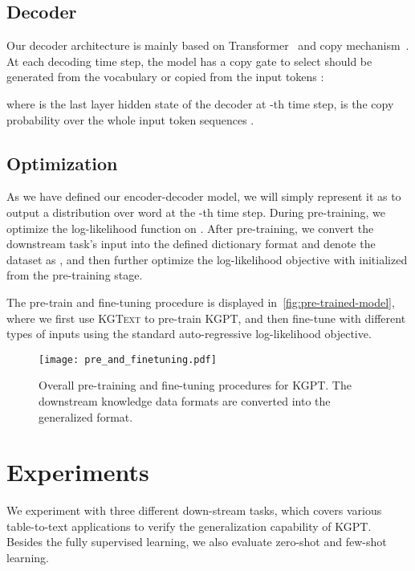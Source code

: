 \documentclass[11pt,a4paper]{article}
\newcommand{\dataset}{\textsc{KGText}\xspace}
\newcommand{\model}{KGPT\xspace}
\begin{document}
\subsection{Decoder}
Our decoder architecture is mainly based on Transformer~\cite{vaswani2017attention} and copy mechanism~\cite{see2017get}. At each decoding time step, the model has a copy gate  to select  should be generated from the vocabulary  or copied from the input tokens :

where  is the last layer hidden state of the decoder at -th time step,  is the copy probability over the whole input token sequences . 

\subsection{Optimization}
As we have defined our encoder-decoder model, we will simply represent it as  to output a distribution over word  at the -th time step. During pre-training, we optimize the log-likelihood function on . After pre-training, we convert the downstream task's input into the defined dictionary format and denote the dataset as , and then further optimize the log-likelihood objective with  initialized from the pre-training stage. 

The pre-train and fine-tuning procedure is displayed in~\autoref{fig:pre-trained-model}, where we first use \dataset to pre-train \model, and then fine-tune with different types of inputs using the standard auto-regressive log-likelihood objective. 
\begin{figure}[!thb]
    \centering
    \texttt{[image: pre\_and\_finetuning.pdf]}
    \caption{Overall pre-training and fine-tuning procedures for \model. The downstream knowledge data formats are converted into the generalized format. }
    \label{fig:pre-trained-model}
\end{figure}



\section{Experiments}
We experiment with three different down-stream tasks, which covers various table-to-text applications to verify the generalization  capability of \model. Besides the fully supervised learning, we also evaluate zero-shot and few-shot learning.
\end{document}
